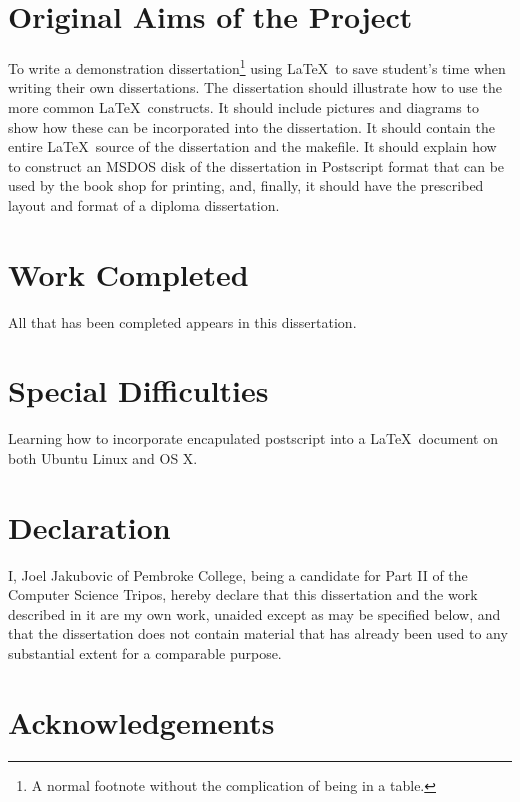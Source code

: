 \documentclass[12pt,a4paper,twoside,openright]{report}
\begin{document}
{\section*{Original Aims of the Project}

To write a demonstration dissertation\footnote{A normal footnote without the
complication of being in a table.} using \LaTeX\ to save
student's time when writing their own dissertations. The dissertation
should illustrate how to use the more common \LaTeX\ constructs. It
should include pictures and diagrams to show how these can be
incorporated into the dissertation.  It should contain the entire
\LaTeX\ source of the dissertation and the makefile.  It should
explain how to construct an MSDOS disk of the dissertation in
Postscript format that can be used by the book shop for printing, and,
finally, it should have the prescribed layout and format of a diploma
dissertation.


\section*{Work Completed}

All that has been completed appears in this dissertation.

\section*{Special Difficulties}

Learning how to incorporate encapulated postscript into a \LaTeX\
document on both Ubuntu Linux and OS X.

\newpage
\section*{Declaration}

I, Joel Jakubovic of Pembroke College, being a candidate for Part II of the Computer
Science Tripos, hereby declare
that this dissertation and the work described in it are my own work,
unaided except as may be specified below, and that the dissertation
does not contain material that has already been used to any substantial
extent for a comparable purpose.

\bigskip
{}

\medskip
{}

\tableofcontents

\listoffigures

\newpage
\section*{Acknowledgements}

}
\end{document}
